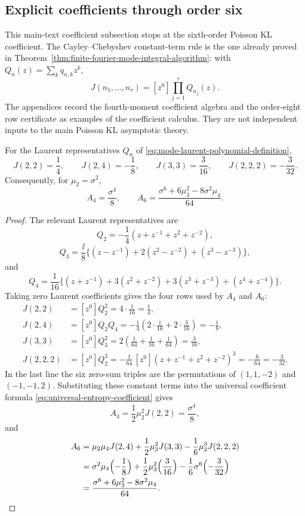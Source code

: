 \subsection{Explicit coefficients through order six}
\label{subsec:explicit-sixth-order-coefficients}

This main-text coefficient subsection stops at the sixth-order Poisson KL
coefficient.  The Cayley--Chebyshev constant-term rule is the one already
proved in Theorem~\ref{thm:finite-fourier-mode-integral-algorithm}: with
\(Q_n(z)=\sum_kq_{n,k}z^k\),
\[
J(n_1,\ldots,n_r)=[z^0]\prod_{j=1}^rQ_{n_j}(z).
\]
The appendices record the fourth-moment coefficient algebra and the
order-eight row certificate as examples of the coefficient calculus.  They
are not independent inputs to the main Poisson KL asymptotic theory.

\begin{lemma}%
\label{lem:sixth-order-coefficient-arithmetic}
For the Laurent representatives \(Q_n\) of
\eqref{eq:mode-laurent-polynomial-definition},
\[
J(2,2)=\frac14,\qquad
J(2,4)=-\frac18,\qquad
J(3,3)=\frac3{16},\qquad
J(2,2,2)=-\frac3{32}.
\]
Consequently, for \(\mu_2=\sigma^2\),
\[
A_4=\frac{\sigma^4}{8},\qquad
A_6=\frac{\sigma^6+6\mu_3^2-8\sigma^2\mu_4}{64}.
\]
\end{lemma}

\begin{proof}
The relevant Laurent representatives are
\[
Q_2=-\frac14(z+z^{-1}+z^2+z^{-2}),
\]
\[
Q_3=\frac{\ii}{8}\{(z-z^{-1})+2(z^2-z^{-2})+(z^3-z^{-3})\},
\]
and
\[
Q_4=\frac1{16}\{(z+z^{-1})+3(z^2+z^{-2})
  +3(z^3+z^{-3})+(z^4+z^{-4})\}.
\]
Taking zero Laurent coefficients gives the four rows used by \(A_4\) and
\(A_6\):
\[
\begin{aligned}
J(2,2)
&=[z^0]Q_2^2
=4\cdot\frac1{16}
=\frac14,\\
J(2,4)
&=[z^0]Q_2Q_4
=-\frac14\left(2\cdot\frac1{16}+2\cdot\frac3{16}\right)
=-\frac18,\\
J(3,3)
&=[z^0]Q_3^2
=2\left(\frac1{64}+\frac1{16}+\frac1{64}\right)
=\frac3{16},\\
J(2,2,2)
&=[z^0]Q_2^3
=-\frac1{64}\,[z^0](z+z^{-1}+z^2+z^{-2})^3
=-\frac6{64}
=-\frac3{32}.
\end{aligned}
\]
In the last line the six zero-sum triples are the permutations of
\((1,1,-2)\) and \((-1,-1,2)\).  Substituting these constant terms into the
universal coefficient formula \eqref{eq:universal-entropy-coefficient} gives
\[
A_4=\frac12\mu_2^2J(2,2)=\frac{\sigma^4}{8},
\]
and
\[
\begin{aligned}
A_6
&=\mu_2\mu_4J(2,4)+\frac12\mu_3^2J(3,3)
-\frac16\mu_2^3J(2,2,2)\\
&=\sigma^2\mu_4\Bigl(-\frac18\Bigr)
+\frac12\mu_3^2\Bigl(\frac3{16}\Bigr)
-\frac16\sigma^6\Bigl(-\frac3{32}\Bigr)\\
&=\frac{\sigma^6+6\mu_3^2-8\sigma^2\mu_4}{64}.
\end{aligned}
\]
\end{proof}

